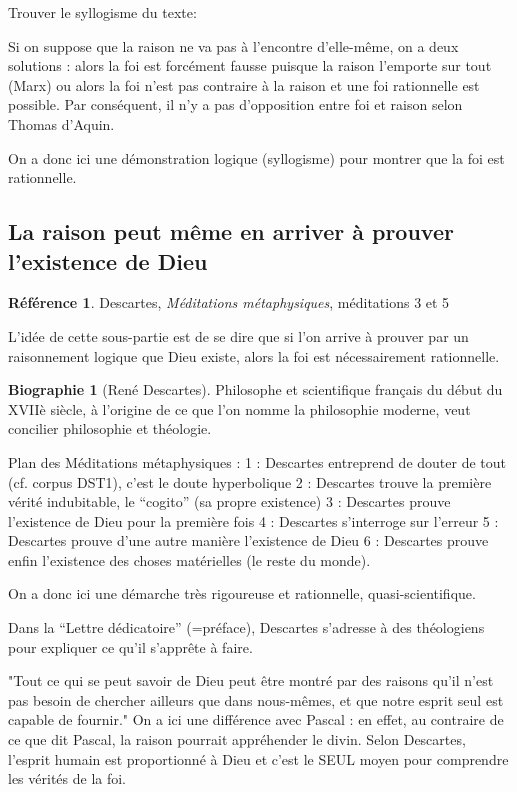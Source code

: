 \documentclass[french]{book}
\theoremstyle{definition}
\newtheorem*{refe}{Référence}
\newtheorem*{bio}{Biographie}
\begin{document}
Trouver le syllogisme du texte:

Si on suppose que la raison ne va pas à l'encontre d’elle-même, on a deux solutions :
alors la foi est forcément fausse puisque la raison l’emporte sur tout (Marx)
ou alors la foi n’est pas contraire à la raison et une foi rationnelle est possible.
Par conséquent, il n’y a pas d’opposition entre foi et raison selon Thomas d’Aquin.

On a donc ici une démonstration logique (syllogisme) pour montrer que la foi est rationnelle.

\subsection{La raison peut même en arriver à prouver l'existence de Dieu}

\begin{refe}
	Descartes, \textit{Méditations métaphysiques}, méditations 3 et 5
\end{refe}

L’idée de cette sous-partie est de se dire que si l’on arrive à prouver par un raisonnement logique que Dieu existe, alors la foi est nécessairement rationnelle.

\begin{bio}[René Descartes]
	Philosophe et scientifique français du début du XVIIè siècle, à l’origine de ce que l’on nomme la philosophie moderne, veut concilier philosophie et théologie.
\end{bio}

Plan des Méditations métaphysiques : 
1 : Descartes entreprend de douter de tout (cf. corpus DST1), c’est le doute hyperbolique
2 : Descartes trouve la première vérité indubitable, le “cogito” (sa propre existence)
3 : Descartes prouve l'existence de Dieu pour la première fois
4 : Descartes s’interroge sur l’erreur
5 : Descartes prouve d’une autre manière l’existence de Dieu
6 : Descartes prouve enfin l’existence des choses matérielles (le reste du monde).

On a donc ici une démarche très rigoureuse et rationnelle, quasi-scientifique.

Dans la “Lettre dédicatoire” (=préface), Descartes s’adresse à des théologiens pour expliquer ce qu’il s’apprête à faire.

"Tout ce qui se peut savoir de Dieu peut être montré par des raisons qu'il n'est pas besoin de chercher ailleurs que dans nous-mêmes, et que notre esprit seul est capable de fournir." On a ici une différence avec Pascal : en effet, au contraire de ce que dit Pascal, la raison pourrait appréhender le divin. Selon Descartes, l'esprit humain est proportionné à Dieu et c'est le SEUL moyen pour comprendre les vérités de la foi.
\end{document}
